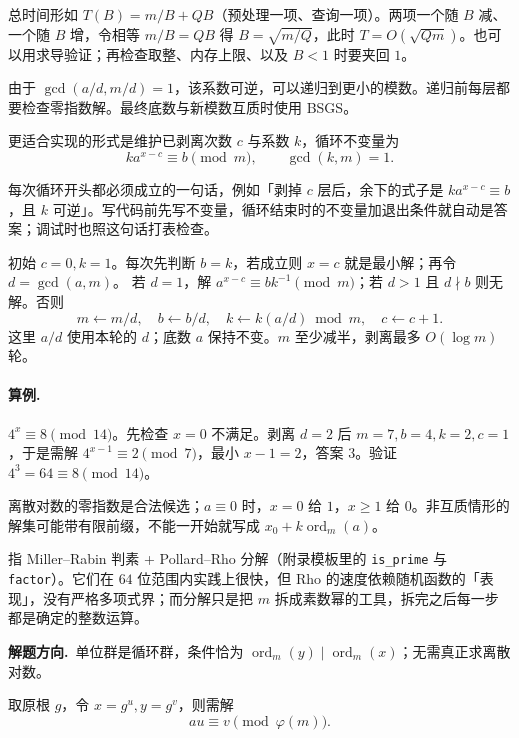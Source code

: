 \documentclass[UTF8,a4paper,11pt,twoside,openright,fontset=fandol]{ctexbook}
\theoremstyle{definition}
\newcommand{\ord}{\operatorname{ord}}
\newcommand{\hint}{\par\noindent\textbf{解题方向.}\ }
\begin{document}
\begin{tip}[「平衡」两个成本的做法]
总时间形如 $T(B)=m/B+QB$（预处理一项、查询一项）。两项一个随 $B$ 减、一个随 $B$ 增，令相等 $m/B=QB$ 得 $B=\sqrt{m/Q}$，此时 $T=O(\sqrt{Qm})$。也可以用求导验证；再检查取整、内存上限、以及 $B<1$ 时要夹回 $1$。
\end{tip}

由于 $\gcd(a/d,m/d)=1$，该系数可逆，可以递归到更小的模数。递归前每层都要检查零指数解。最终底数与新模数互质时使用 BSGS。


更适合实现的形式是维护已剥离次数 $c$ 与系数 $k$，循环不变量为
\[
 k a^{x-c}\equiv b\pmod m,\qquad\gcd(k,m)=1.
\]

\begin{tip}
每次循环开头都必须成立的一句话，例如「剥掉 $c$ 层后，余下的式子是 $ka^{x-c}\equiv b$，且 $k$ 可逆」。写代码前先写不变量，循环结束时的不变量加退出条件就自动是答案；调试时也照这句话打表检查。
\end{tip}

初始 $c=0,k=1$。每次先判断 $b=k$，若成立则 $x=c$ 就是最小解；再令 $d=\gcd(a,m)$。
若 $d=1$，解 $a^{x-c}\equiv bk^{-1}\pmod m$；若 $d>1$ 且 $d\nmid b$ 则无解。否则
\[
 m\gets m/d,\quad b\gets b/d,\quad
 k\gets k(a/d)\bmod m,\quad c\gets c+1.
\]
这里 $a/d$ 使用本轮的 $d$；底数 $a$ 保持不变。$m$ 至少减半，剥离最多 $O(\log m)$ 轮。

\paragraph{算例.} $4^x\equiv8\pmod{14}$。先检查 $x=0$ 不满足。剥离 $d=2$ 后 $m=7,b=4,k=2,c=1$，于是需解 $4^{x-1}\equiv2\pmod7$，最小 $x-1=2$，答案 $3$。验证 $4^3=64\equiv8\pmod{14}$。
\begin{pitfall}
离散对数的零指数是合法候选；$a\equiv0$ 时，$x=0$ 给 $1$，$x\ge1$ 给 $0$。非互质情形的解集可能带有限前缀，不能一开始就写成 $x_0+k\ord_m(a)$。
\end{pitfall}


\begin{tip}
指 Miller--Rabin 判素 + Pollard--Rho 分解（附录模板里的 \texttt{is\_prime} 与 \texttt{factor}）。它们在 $64$ 位范围内实践上很快，但 Rho 的速度依赖随机函数的「表现」，没有严格多项式界；而分解只是把 $m$ 拆成素数幂的工具，拆完之后每一步都是确定的整数运算。
\end{tip}

\hint 单位群是循环群，条件恰为 $\ord_m(y)\mid\ord_m(x)$；无需真正求离散对数。

取原根 $g$，令 $x=g^u,y=g^v$，则需解
\[
 au\equiv v\pmod{\varphi(m)}.
\]
\end{document}

